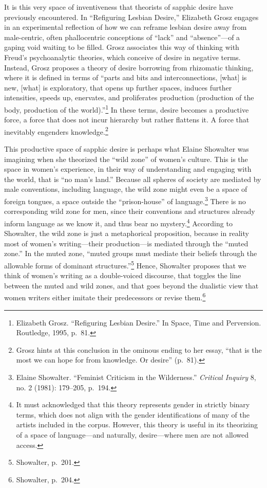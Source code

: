 \documentclass[
  letterpaper,
  DIV=11,
  numbers=noendperiod]{scrartcl}
\begin{document}
It is this very space of inventiveness that theorists of sapphic desire
have previously encountered. In ``Refiguring Lesbian Desire,'' Elizabeth
Grosz engages in an experimental reflection of how we can reframe
lesbian desire away from male-centric, often phallocentric conceptions
of ``lack'' and ``absence''---of a gaping void waiting to be filled.
Grosz associates this way of thinking with Freud's psychoanalytic
theories, which conceive of desire in negative terms. Instead, Grosz
proposes a theory of desire borrowing from rhizomatic thinking, where it
is defined in terms of ``parts and bits and interconnections, {[}what{]}
is new, {[}what{]} is exploratory, that opens up further spaces, induces
further intensities, speeds up, enervates, and proliferates production
(production of the body, production of the world).''\footnote{Elizabeth
  Grosz. ``Refiguring Lesbian Desire.'' In Space, Time and Perversion.
  Routledge, 1995, p.~81.} In these terms, desire becomes a productive
force, a force that does not incur hierarchy but rather flattens it. A
force that inevitably engenders knowledge.\footnote{Grosz hints at this
  conclusion in the ominous ending to her essay, ``that is the most we
  can hope for from knowledge. Or desire'' (p.~81).}

This productive space of sapphic desire is perhaps what Elaine Showalter
was imagining when she theorized the ``wild zone'' of women's culture.
This is the space in women's experience, in their way of understanding
and engaging with the world, that is ``no man's land.'' Because all
spheres of society are mediated by male conventions, including language,
the wild zone might even be a space of foreign tongues, a space outside
the ``prison-house'' of language.\footnote{Elaine Showalter. ``Feminist
  Criticism in the Wilderness.'' \emph{Critical Inquiry} 8, no. 2
  (1981): 179--205, p.~194.} There is no corresponding wild zone for
men, since their conventions and structures already inform language as
we know it, and thus bear no mystery.\footnote{It must acknowledged that
  this theory represents gender in strictly binary terms, which does not
  align with the gender identifications of many of the artists included
  in the corpus. However, this theory is useful in its theorizing of a
  space of language---and naturally, desire---where men are not allowed
  access.} According to Showalter, the wild zone is just a metaphorical
proposition, because in reality most of women's writing---their
production---is mediated through the ``muted zone.'' In the muted zone,
``muted groups must mediate their beliefs through the allowable forms of
dominant structures.''\footnote{Showalter, p.~201.} Hence, Showalter
proposes that we think of women's writing as a double-voiced discourse,
that toggles the line between the muted and wild zones, and that goes
beyond the dualistic view that women writers either imitate their
predecessors or revise them.\footnote{Showalter, p.~204.}
\end{document}
